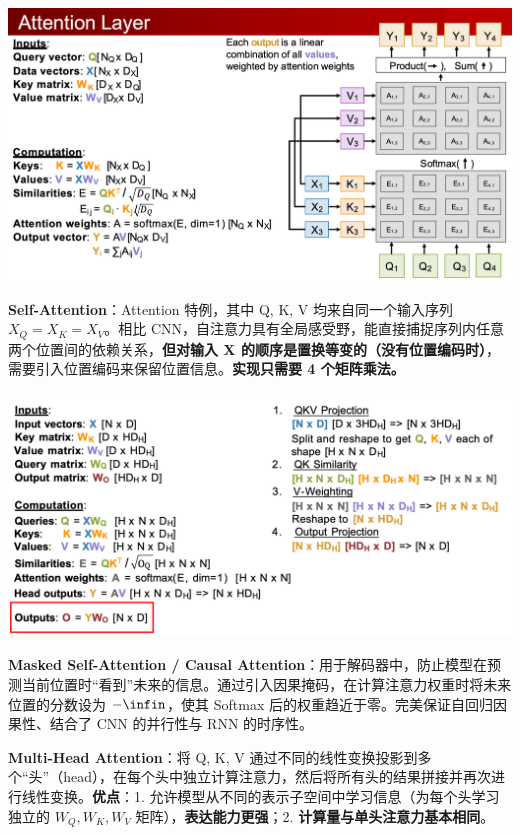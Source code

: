 \documentclass[
  8pt]{extarticle}
\begin{document}
\begin{multicols*}{4}
\includegraphics{./Cheatsheet-02-Self-Attention-and-Transformer.assets/image-20250617231033149.png}

\textbf{Self-Attention}：Attention 特例，其中 Q, K, V
均来自同一个输入序列 \(X_{Q}=X_{K}=X_{V}\)。相比
CNN，自注意力具有全局感受野，能直接捕捉序列内任意两个位置间的依赖关系，\textbf{但对输入
X
的顺序是置换等变的（没有位置编码时）}，需要引入位置编码来保留位置信息。\textbf{实现只需要
4 个矩阵乘法。}

\includegraphics{./Cheatsheet-02-Self-Attention-and-Transformer.assets/image-20250617232437127.png}

\textbf{Masked Self-Attention / Causal
Attention}：用于解码器中，防止模型在预测当前位置时``看到''未来的信息。通过引入因果掩码，在计算注意力权重时将未来位置的分数设为
\(-\infin\)，使其 Softmax 后的权重趋近于零。完美保证自回归因果性、结合了
CNN 的并行性与 RNN 的时序性。

\textbf{Multi-Head Attention}：将 Q, K, V
通过不同的线性变换投影到多个``头''（head），在每个头中独立计算注意力，然后将所有头的结果拼接并再次进行线性变换。\textbf{优点}：1.
允许模型从不同的表示子空间中学习信息（为每个头学习独立的
\(W_Q, W_K, W_V\) 矩阵），\textbf{表达能力更强}；2.
\textbf{计算量与单头注意力基本相同}。


\end{multicols*}
\end{document}
